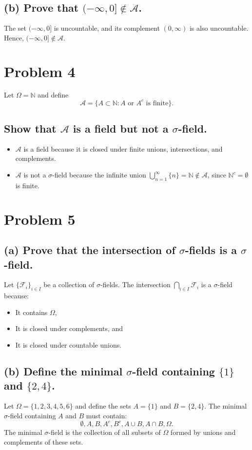 \documentclass{article}
\begin{document}
\subsection*{(b) Prove that \( (-\infty, 0] \notin \mathcal{A} \).}
The set \( (-\infty, 0] \) is uncountable, and its complement \( (0, \infty) \) is also uncountable. Hence, \( (-\infty, 0] \notin \mathcal{A} \).

\section*{Problem 4}
Let \( \Omega = \mathbb{N} \) and define
\[
\mathcal{A} = \{A \subset \mathbb{N} : A \text{ or } A^c \text{ is finite}\}.
\]

\subsection*{Show that \( \mathcal{A} \) is a field but not a \( \sigma \)-field.}
\begin{itemize}
    \item \( \mathcal{A} \) is a field because it is closed under finite unions, intersections, and complements.
    \item \( \mathcal{A} \) is not a \( \sigma \)-field because the infinite union \( \bigcup_{n=1}^{\infty} \{n\} = \mathbb{N} \notin \mathcal{A} \), since \( \mathbb{N}^c = \emptyset \) is finite.
\end{itemize}

\section*{Problem 5}
\subsection*{(a) Prove that the intersection of \( \sigma \)-fields is a \( \sigma \)-field.}
Let \( \{\mathcal{F}_i\}_{i \in I} \) be a collection of \( \sigma \)-fields. The intersection \( \bigcap_{i \in I} \mathcal{F}_i \) is a \( \sigma \)-field because:
\begin{itemize}
    \item It contains \( \Omega \),
    \item It is closed under complements, and
    \item It is closed under countable unions.
\end{itemize}

\subsection*{(b) Define the minimal \( \sigma \)-field containing \( \{1\} \) and \( \{2, 4\} \).}
Let \( \Omega = \{1, 2, 3, 4, 5, 6\} \) and define the sets \( A = \{1\} \) and \( B = \{2, 4\} \). The minimal \( \sigma \)-field containing \( A \) and \( B \) must contain:
\[
\emptyset, A, B, A^c, B^c, A \cup B, A \cap B, \Omega.
\]
The minimal \( \sigma \)-field is the collection of all subsets of \( \Omega \) formed by unions and complements of these sets.
\end{document}
